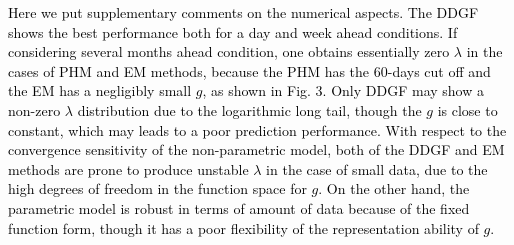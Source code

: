 \documentclass[review]{elsarticle}
\newcommand{\blue}[1]{\textcolor{black}{#1}}
\begin{document}
\blue{
Here we put supplementary comments on the numerical aspects.
The DDGF shows the best performance both for a day and week ahead conditions.
If considering several months ahead condition, one obtains essentially zero $\lambda$ in the cases of PHM and EM methods, because the PHM has the 60-days cut off and the EM has a negligibly small $g$, as shown in Fig. 3.
Only DDGF may show a non-zero $\lambda$ distribution due to the logarithmic long tail, 
though the $g$ is close to constant, 
which may leads to a poor prediction performance.
With respect to the convergence sensitivity of the non-parametric model,
both of the DDGF  and EM methods are prone to produce unstable $\lambda$ in the case of small data,
due to the high degrees of freedom in the function space for $g$.
On the other hand, the parametric model is robust in terms of amount of data because of the fixed function form, though it has a poor flexibility of the representation ability of $g$.
%
%
}


\end{document}
